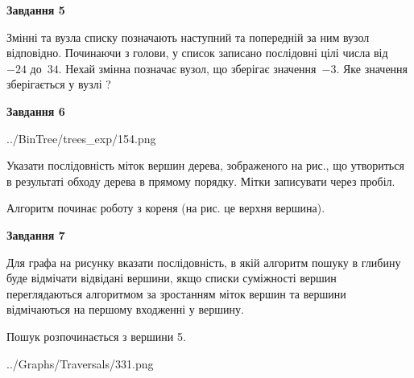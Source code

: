 \documentclass[12pt, ukrainian]{article}
\begin{document}
{\begin {large}
{\begin {center}\textbf{Завдання 5}\end {center}}\par
Змінні  та  вузла списку позначають наступний та попередній за ним вузол відповідно. Починаючи з голови, у список записано послідовні цілі числа від~$-24$ до~$34$. Нехай змінна  позначає вузол, що зберігає значення~$-3$.
Яке значення зберігається у вузлі  ?\par
\newpage

{\begin {center}\textbf{Завдання 6}\end {center}}\par

\begin{center}
	{../BinTree/trees_exp/154.png}
\end{center}
Указати послідовність міток вершин дерева, зображеного на рис., що утвориться в результаті обходу дерева в прямому порядку. Мітки записувати через пробіл.\par Алгоритм починає роботу з кореня (на рис. це верхня вершина).\par
\newpage

{\begin {center}\textbf{Завдання 7}\end {center}}\par
Для графа на рисунку вказати послідовність, в якій алгоритм пошуку в глибину буде відмічати відвідані вершини, якщо списки суміжності вершин переглядаються алгоритмом за зростанням міток вершин та вершини відмічаються на першому вход\-женні у вершину.\par
Пошук розпочинається з вершини 5.\par

\begin{center}
	{../Graphs/Traversals/331.png}
\end{center}\par
\newpage


\end{large}}
\end{document}
